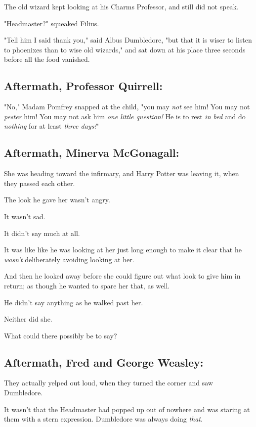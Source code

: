 The old wizard kept looking at his Charms Professor, and still did not speak.

"Headmaster?" squeaked Filius.

"Tell him I said thank you," said Albus Dumbledore, "but that it is wiser to
listen to phoenixes than to wise old wizards," and sat down at his place three
seconds before all the food vanished.
\sbreak
\vspace{-2\baselineskip}
\subsection{Aftermath, Professor Quirrell:}

"No," Madam Pomfrey snapped at the child, "you may \emph{not} see him! You may
not \emph{pester} him! You may not ask him \emph{one little question!} He is to
rest \emph{in bed} and do \emph{nothing} for at least \emph{three days!}"
\sbreak
\vspace{-2\baselineskip}
\subsection{Aftermath, Minerva McGonagall:}

She was heading toward the infirmary, and Harry Potter was leaving it, when
they passed each other.

The look he gave her wasn't angry.

It wasn't sad.

It didn't say much at all.

It was like{\el} like he was looking at her just long enough to make it
clear that he \emph{wasn't} deliberately avoiding looking at her.

And then he looked away before she could figure out what look to give him in
return; as though he wanted to spare her that, as well.

He didn't say anything as he walked past her.

Neither did she.

What could there possibly be to say?
\sbreak
\vspace{-2\baselineskip}
\subsection{Aftermath, Fred and George Weasley:}

They actually yelped out loud, when they turned the corner and saw Dumbledore.

It wasn't that the Headmaster had popped up out of nowhere and was staring at
them with a stern expression. Dumbledore was always doing \emph{that}.

